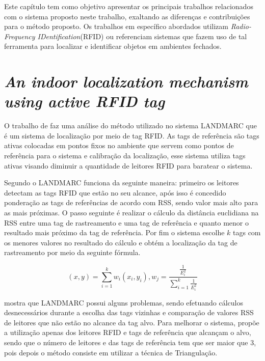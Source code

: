 
\label{chapter:correlatos}

Este capítulo tem como objetivo apresentar os principais trabalhos relacionados com o sistema proposto neste trabalho, 
exaltando as diferenças e contribuições para o método proposto. Os trabalhos em específico abordados 
utilizam \textit{Radio-Frequency IDentification}(RFID) ou referenciam sistemas que fazem uso de tal ferramenta para localizar e identificar objetos em ambientes 
fechados.

%
%
\section{\textit{An indoor localization mechanism using active RFID tag}}

O trabalho de  faz uma análise do método utilizado no sistema LANDMARC 
que é um sistema de localização por meio de tag RFID. As tags de referência são tags ativas colocadas em pontos fixos no ambiente
que servem como pontos de referência para o sistema e calibração da localização, esse sistema utiliza tags ativas visando 
diminuir a quantidade de leitores RFID para baratear o sistema.

Segundo  o LANDMARC funciona da seguinte maneira: primeiro os leitores detectam as tags RFID que estão 
no seu alcance, após isso é concedido ponderação as tags de referências de acordo com RSS, sendo valor mais alto para as mais 
próximas. O passo seguinte é realizar o cálculo da distância euclidiana na RSS entre uma tag de rastreamento e uma tag de 
referência e quanto menor o resultado mais próximo da tag de referência. Por fim o sistema escolhe $k$ tags com os menores valores no 
resultado do cálculo e obtém a localização da tag de rastreamento por meio da seguinte fórmula.

\begin{equation}
(x,y) = \sum^k_{i=1}w_i(x_i,y_i), w_j=\frac{\frac{1}{E_i^2}}{\sum_{i=1}^k\frac{1}{E^2_i}} 
\end{equation}


 mostra que LANDMARC possui alguns problemas, sendo efetuando cálculos desnecessários 
durante a escolha das tags vizinhas e comparação de valores RSS de leitores que não estão no alcance da tag alvo. 
Para melhorar o sistema,  propõe a utilização apenas dos leitores RFID  e tags de referência 
que alcançam o alvo, sendo que o número de leitores e das tags de referência tem que ser maior que 
$3$, pois depois o método consiste em utilizar a técnica de Triangulação.


